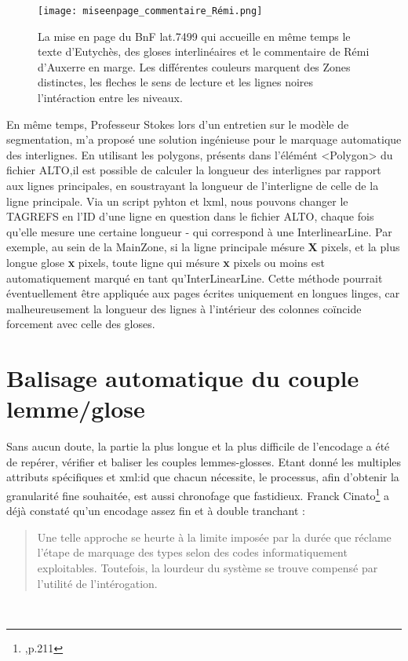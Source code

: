 \documentclass[a4paper, twoside, 12pt]{book}
\begin{document}
\begin{figure}[H]
    \centering
    \texttt{[image: miseenpage\_commentaire\_Rémi.png]}
    \caption{La mise en page du BnF lat.7499 qui accueille en même temps le texte d'Eutychès, des gloses interlinéaires et le commentaire de Rémi d'Auxerre en marge. Les différentes couleurs marquent des Zones distinctes, les fleches le sens de lecture et les lignes noires l'intéraction entre les niveaux.}
\end{figure}

En même temps, Professeur Stokes lors d'un entretien sur le modèle de segmentation, m'a proposé une solution ingénieuse pour le marquage automatique des interlignes. En utilisant les polygons, présents dans l'élémént <Polygon> du fichier ALTO,il est possible de calculer la longueur des interlignes par rapport aux lignes principales, en soustrayant la longueur de l'interligne de celle de la ligne principale. Via un script pyhton et lxml, nous pouvons changer le TAGREFS en l'ID d'une ligne en question dans le fichier ALTO, chaque fois qu'elle mesure une certaine longueur - qui correspond à une InterlinearLine. Par exemple, au sein de la MainZone, si la ligne principale mésure \textbf{X} pixels, et la plus longue glose \textbf{x} pixels, toute ligne qui mésure \textbf{x} pixels ou moins est automatiquement marqué en tant qu'InterLinearLine. Cette méthode pourrait éventuellement être appliquée aux pages écrites uniquement en longues linges, car malheureusement la longueur des lignes à l'intérieur des colonnes coïncide forcement avec celle des gloses.

\section{Balisage automatique du couple lemme/glose}

Sans aucun doute, la partie la plus longue et la plus difficile de l'encodage a été de repérer, vérifier et baliser les couples lemmes-glosses. Etant donné les multiples attributs spécifiques et xml:id que chacun nécessite, le processus, afin d'obtenir la granularité fine souhaitée, est aussi chronofage que fastidieux. Franck Cinato\footnote{\cite{cinato2015priscien},p.211} a déjà constaté qu'un encodage assez fin et à double tranchant : \blockquote{Une telle approche se heurte à la limite imposée par la durée que réclame l’étape de marquage des types selon des codes informatiquement exploitables. Toutefois, la lourdeur du système se trouve compensé par l'utilité de l'intérogation.} \\
\end{document}
